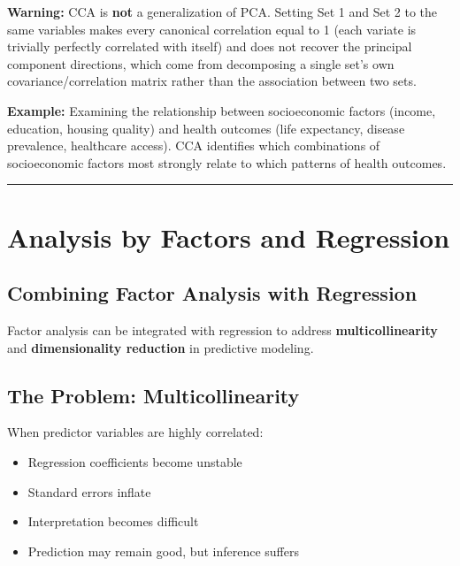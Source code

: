 \documentclass[
]{article}
\begin{document}
\textbf{Warning: } CCA is \textbf{not} a generalization of PCA. Setting
Set 1 and Set 2 to the same variables makes every canonical correlation
equal to 1 (each variate is trivially perfectly correlated with itself)
and does not recover the principal component directions, which come from
decomposing a single set's own covariance/correlation matrix rather than
the association between two sets.

\textbf{Example: } Examining the relationship between socioeconomic
factors (income, education, housing quality) and health outcomes (life
expectancy, disease prevalence, healthcare access). CCA identifies which
combinations of socioeconomic factors most strongly relate to which
patterns of health outcomes.

\begin{center}\rule{0.5\linewidth}{0.5pt}\end{center}

\textbf{ }

\section{Analysis by Factors and Regression}

\textbf{ }

\subsection{Combining Factor Analysis with Regression}

Factor analysis can be integrated with regression to address
\textbf{multicollinearity} and \textbf{dimensionality reduction} in
predictive modeling.

\textbf{ }

\subsection{The Problem: Multicollinearity}

When predictor variables are highly correlated:

\begin{itemize}
\item
  Regression coefficients become unstable
\item
  Standard errors inflate
\item
  Interpretation becomes difficult
\item
  Prediction may remain good, but inference suffers
\end{itemize}
\end{document}
